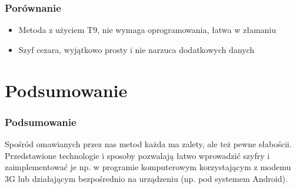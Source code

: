 \documentclass[xcolor=table]{beamer}
\begin{document}
\begin{frame}
  \frametitle{Porównanie}
    \begin{itemize}
\item Metoda z użyciem T9, nie wymaga oprogramowania, łatwa w złamaniu
\item Szyf cezara, wyjątkowo prosty i nie narzuca dodatkowych danych
\end{itemize}

\end{frame}

\section{Podsumowanie}

\begin{frame}
  \frametitle{Podsumowanie}
Spośród omawianych przez nas metod każda ma zalety, ale też pewne słabościi.\\[\baselineskip] Przedstawione technologie i sposoby pozwalają łatwo wprowadzić szyfry i zaimplementować je np. w programie komputerowym korzystającym z modemu 3G lub działającym bezpośrednio na urządzeniu (np. pod systemem Android).

\end{frame}
\end{document}
